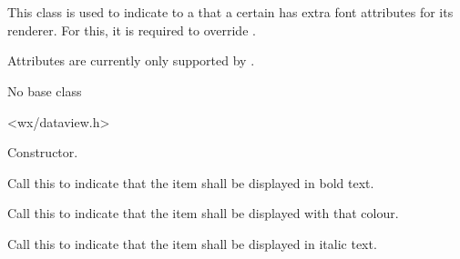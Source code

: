 \section{}\label{wxdataviewitemattr}

This class is used to indicate to a 
that a certain  has extra font attributes
for its renderer. For this, it is required to override 
.

Attributes are currently only supported by 
.


No base class


<wx/dataview.h>







\label{wxdataviewitemattrwxdataviewitemattr}


Constructor.


\label{wxdataviewitemattrsetbold}


Call this to indicate that the item shall be displayed in bold text.

\label{wxdataviewitemattrsetcolour}


Call this to indicate that the item shall be displayed with
that colour.

\label{wxdataviewitemattrsetitalic}


Call this to indicate that the item shall be displayed in italic text.

